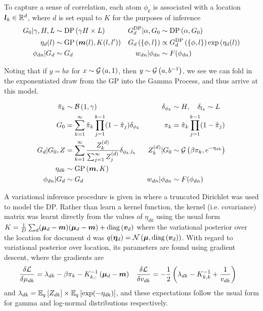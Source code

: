 To capture a sense of correlation, each atom $\phi_k$ is associated with a location $\vv{l}_k \in \VReal{d}$, where $d$ is set equal to $K$ for the purposes of inference
\begin{align}
G_0 | \gamma, H, L & \sim \DP{\gamma H \times L } &
G_d^{\text{DP}} | \alpha, G_0 & \sim \DP{\alpha, G_0} \\
\eta_d(l) & \sim \GP{\vv{m}(l)}{K(l, l')} &
G_d\left(\{\phi, l\}\right) & \propto G_d^{\text{DP}}\left(\{\phi, l\}\right) \exp\left(\eta_d(l) \right) \\
\phi_{dn} |G_d &\sim G_d & w_{dn} | \phi_{dn} & \sim F(\phi_{dn})
\end{align}

Noting that if $y = bx$ for $x \sim \gam{a}{1}$, then $y \sim \gam{a}{b^{-1}}$, we see we can fold in the exponentiated draw from the GP into the Gamma Process, and thus arrive at this model.

\begin{align}
\hat{\pi}_k & \sim \mathcal{B}\left(1, \gamma\right) &
\delta_{\phi_k} & \sim H,\quad \delta_{l_k} \sim L \\
G_0 & = \sum_{k=1}^\infty \hat{\pi}_k \prod_{j=1}^{k-1} (1 - \hat{\pi}_j)\delta_{\phi_k} & 
\pi_k & = \hat{\pi}_k \prod_{j=1}^{k-1} (1 - \hat{\pi}_j) \\
G_d|G_0, Z & = \sum_{k=1}^\infty \frac{Z_k^{(d)}}{\sum_{j=1}^\infty Z_j^{(d)}} \delta_{\phi_k, l_k} &
Z_k^{(d)} | G_0 &\sim \gam{\beta \pi_k}{e^{-\eta_{dk}}} \\
\eta_{dk} & \sim \GP{\vv{m}}{K} \\
\phi_{dn} |G_d &\sim G_d & w_{dn} | \phi_{dn} & \sim F(\phi_{dn})
\end{align}

A variational inference procedure is given in \cite{Paisley2012b} where a truncated Dirichlet was used to model the DP. Rather than learn a kernel function, the kernel (i.e. covariance) matrix was learnt directly from the values of $\eta_{dk}$ using the usual form $K = \frac{1}{D} \sum_d (\vv{\mu}_d - \vv{m})(\vv{\mu}_d - \vv{m}) + \diag{\vv{v}_d}$ where the variational posterior over the location for document d was $q(\vv{\eta}_d) = \nor{\vv{\mu}}{\diag{\vv{v}_d}}$. With regard to variational posterior over location, its parameters are found using gradient descent, where the gradients are
\begin{align}
\frac{\delta \mathcal{L}}{\delta \mu_{dk}} & = \lambda_{dk} - \beta \pi_k - K^{-1}_{k,:} \left( \vv{\mu}_d - \vv{m}\right) &
\frac{\delta \mathcal{L}}{\delta v_{dk}} & = -\half \left( \lambda_{dk} - K^{-1}_{k,k} + \oneover{v_{dk}}\right)
\end{align}
and $\lambda_{dk} = \ex{Z_{dk}}{q} \times \ex{\exp(-\eta_{dk})}{q}$, and these expectations follow the usual form for gamma and log-normal distributions respectively. 

